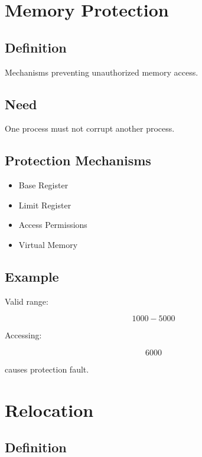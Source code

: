 \section{Memory Protection}

\subsection{Definition}

Mechanisms preventing unauthorized memory access.

\subsection{Need}

One process must not corrupt another process.

\subsection{Protection Mechanisms}

\begin{itemize}
\item Base Register
\item Limit Register
\item Access Permissions
\item Virtual Memory
\end{itemize}

\subsection{Example}

Valid range:

\[
1000 - 5000
\]

Accessing:

\[
6000
\]

causes protection fault.

\section{Relocation}

\subsection{Definition}

